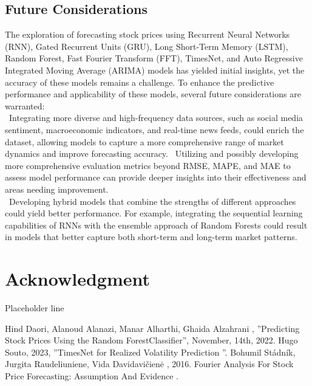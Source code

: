 \documentclass{ieeeojies}
\begin{document}
\subsection{Future Considerations}
The exploration of forecasting stock prices using Recurrent Neural Networks (RNN), Gated Recurrent Units (GRU), Long Short-Term Memory (LSTM), Random Forest, Fast Fourier Transform (FFT), TimesNet, and Auto Regressive Integrated Moving Average (ARIMA) models has yielded initial insights, yet the accuracy of these models remains a challenge. To enhance the predictive performance and applicability of these models, several future considerations are warranted:\\
\indent\textbullet\
Integrating more diverse and high-frequency data sources, such as social media sentiment, macroeconomic indicators, and real-time news feeds, could enrich the dataset, allowing models to capture a more comprehensive range of market dynamics and improve forecasting accuracy.
\indent\textbullet\
Utilizing and possibly developing more comprehensive evaluation metrics beyond RMSE, MAPE, and MAE to assess model performance can provide deeper insights into their effectiveness and areas needing improvement.
\\\indent\textbullet\
Developing hybrid models that combine the strengths of different approaches could yield better performance. For example, integrating the sequential learning capabilities of RNNs with the ensemble approach of Random Forests could result in models that better capture both short-term and long-term market patterns.

\section*{Acknowledgment}
\addcontentsline{toc}{section}{Acknowledgment}
Placeholder line

\begin{thebibliography}{00}
 Hind Daori, Alanoud Alanazi, Manar Alharthi, Ghaida Alzahrani
 ,  ''Predicting Stock Prices Using the Random ForestClassifier'', November, 14th, 2022.
\bibitem{b2} Hugo Souto, 2023, ''TimesNet for Realized Volatility Prediction
''.
\bibitem{b3} Bohumil Stádník, Jurgita Raudeliuniene, Vida Davidavičienė , 2016. Fourier Analysis For Stock Price Forecasting: Assumption And Evidence .

\end{thebibliography}


\EOD
\end{document}
